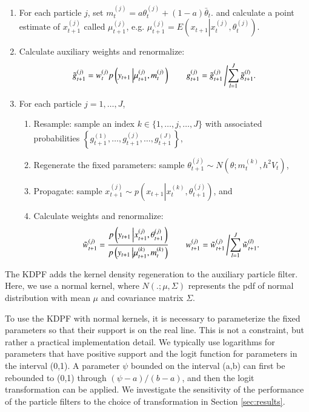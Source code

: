 \documentclass{elsarticle}
\begin{document}
\begin{enumerate}
\item For each particle $j$, set $m_t^{(j)} = a\theta_t^{(j)} + (1-a)\bar{\theta}_t.$ and calculate a point estimate of $x_{t+1}^{(j)}$ called $\mu_{t+1}^{(j)}$, e.g. $\mu_{t+1}^{(j)} = E\left(x_{t+1}\left|x_t^{(j)},\theta_t^{(j)} \right.\right)$.
\item Calculate auxiliary weights and renormalize:
\[ \tilde{g}_{t+1}^{(j)} = w_t^{(j)} p\left(y_{t+1}\left|\mu_{t+1}^{(j)},m_t^{(j)}\right.\right) \qquad g_{t+1}^{(j)} = \tilde{g}_{t+1}^{(j)}\left/ \sum_{l=1}^J \tilde{g}_{t+1}^{(l)}. \right. \]
\item For each particle $j=1,\ldots,J$,
	\begin{enumerate}
    \item Resample: sample an index $k\in\{1,\ldots,j,\ldots,J\}$ with associated probabilities $\left\{g_{t+1}^{(1)},\ldots,g_{t+1}^{(j)},\ldots,g_{t+1}^{(J)}\right\}$,
	\item Regenerate the fixed parameters: sample $\theta_{t+1}^{(j)} \sim N\left(\theta; m_t^{(k)}, h^2V_t \right)$,
	\item Propagate: sample $x_{t+1}^{(j)} \sim p\left(x_{t+1}\left|x_t^{(k)},\theta_{t+1}^{(j)}\right.\right)$, and
	\item Calculate weights and renormalize:
	\[ \tilde{w}_{t+1}^{(j)} = \frac{p\left(y_{t+1}\left|x_{t+1}^{(j)},\theta_{t+1}^{(j)}\right.\right)}{p\left(y_{t+1}\left|\mu_{t+1}^{(k)},m_t^{(k)}\right.\right)}
	\qquad
	w_{t+1}^{(j)} = \tilde{w}_{t+1}^{(j)}\left/\sum_{l=1}^J \tilde{w}_{t+1}^{(l)}. \right. \]
	\end{enumerate}
\end{enumerate}

\noindent The KDPF adds the kernel density regeneration to the auxiliary particle filter. Here, we use a normal kernel, where $N(.;\mu,\Sigma)$ represents the pdf of normal distribution with mean $\mu$ and covariance matrix $\Sigma$.

To use the KDPF with normal kernels, it is necessary to parameterize the fixed parameters so that their support is on the real line. This is not a constraint, but rather a practical implementation detail. We typically use logarithms for parameters that have positive support and the logit function for parameters in the interval (0,1). A parameter $\psi$ bounded on the interval (a,b) can first be rebounded to (0,1) through $(\psi-a)/(b-a)$, and then the logit transformation can be applied. We investigate the sensitivity of the performance of the particle filters to the choice of transformation in Section \ref{sec:results}.
\end{document}
